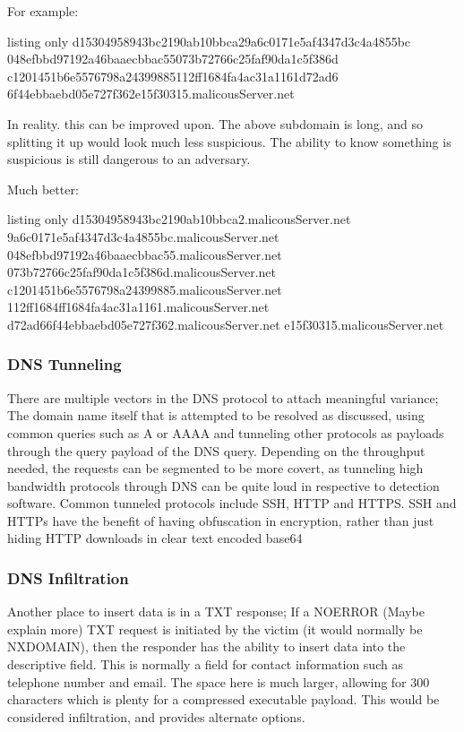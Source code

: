For example:
\begin{tcblisting}{listing only}
    d15304958943bc2190ab10bbca29a6c0171e5af4347d3c4a4855bc
    048efbbd97192a46baaecbbac55073b72766c25faf90da1c5f386d
    c1201451b6e5576798a24399885112ff1684fa4ac31a1161d72ad6
    6f44ebbaebd05e727f362e15f30315.malicousServer.net
\end{tcblisting}

In reality. this can be improved upon. The above subdomain is long, and so splitting it up would look much less suspicious. The ability to know something is suspicious is
still dangerous to an adversary.

Much better:
\begin{tcblisting}{listing only}
    d15304958943bc2190ab10bbca2.malicousServer.net
    9a6c0171e5af4347d3c4a4855bc.malicousServer.net
    048efbbd97192a46baaecbbac55.malicousServer.net
    073b72766c25faf90da1c5f386d.malicousServer.net
    c1201451b6e5576798a24399885.malicousServer.net
    112ff1684ff1684fa4ac31a1161.malicousServer.net
    d72ad66f44ebbaebd05e727f362.malicousServer.net
    e15f30315.malicousServer.net
\end{tcblisting}

\subsubsection{DNS Tunneling}
There are multiple vectors in the DNS protocol to attach meaningful variance; 
The domain name itself that is attempted to be resolved as discussed, using common queries such as A or AAAA and tunneling other protocols as payloads
through the query payload of the DNS query. Depending on the throughput needed, the requests can be segmented to be more covert, as tunneling 
high bandwidth protocols through DNS can be quite loud in respective to detection software. \citep{DNSExfiltration} Common tunneled protocols include
SSH, HTTP and HTTPS. SSH and HTTPs have the benefit of having obfuscation in encryption, rather than just hiding HTTP downloads in clear text encoded base64 \citep{DNSTunneling}


\subsubsection{DNS Infiltration}

Another place to insert data is in a TXT response; If a NOERROR (Maybe explain more) TXT request is initiated by the victim (it would normally be NXDOMAIN), 
then the responder has the ability to insert data into the descriptive field. This is normally a field for contact information such as telephone number and email.
The space here is much larger, allowing for 300 characters which is plenty for a compressed executable payload. This would be considered infiltration, and provides alternate options. \citep{DNSTunneling}


